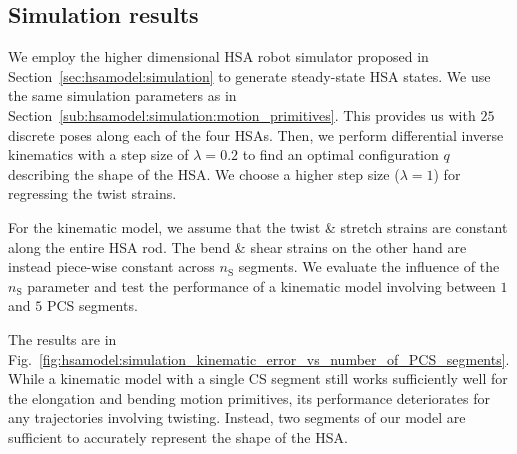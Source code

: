
\subsection{Simulation results}\label{sub:hsamodel:simulation_results}
%
We employ the higher dimensional \gls{HSA} robot simulator proposed in Section~\ref{sec:hsamodel:simulation} to generate steady-state \gls{HSA} states. We use the same simulation parameters as in Section~\ref{sub:hsamodel:simulation:motion_primitives}. This provides us with $25$ discrete poses along each of the four \glspl{HSA}.
Then, we perform differential inverse kinematics with a step size of $\lambda = 0.2$ to find an optimal configuration $q$ describing the shape of the \gls{HSA}. We choose a higher step size ($\lambda=1$) for regressing the twist strains.

For the kinematic model, we assume that the twist \& stretch strains are constant along the entire \gls{HSA} rod. The bend \& shear strains on the other hand are instead piece-wise constant across $n_\mathrm{S}$ segments. We evaluate the influence of the $n_\mathrm{S}$ parameter and test the performance of a kinematic model involving between $1$ and $5$ \gls{PCS} segments.

The results are in Fig.~\ref{fig:hsamodel:simulation_kinematic_error_vs_number_of_PCS_segments}. While a kinematic model with a single \gls{CS} segment still works sufficiently well for the elongation and bending motion primitives, its performance deteriorates for any trajectories involving twisting. Instead, two segments of our model are sufficient to accurately represent the shape of the \gls{HSA}. 


